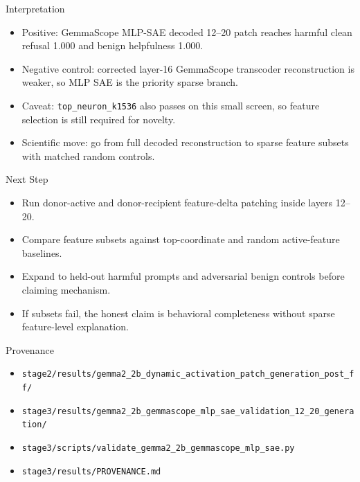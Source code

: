 \documentclass[aspectratio=169]{beamer}
\begin{document}
\begin{frame}{Interpretation}
  \begin{itemize}
    \item Positive: GemmaScope MLP-SAE decoded 12--20 patch reaches harmful clean refusal 1.000 and benign helpfulness 1.000.
    \item Negative control: corrected layer-16 GemmaScope transcoder reconstruction is weaker, so MLP SAE is the priority sparse branch.
    \item Caveat: \texttt{top\_neuron\_k1536} also passes on this small screen, so feature selection is still required for novelty.
    \item Scientific move: go from full decoded reconstruction to sparse feature subsets with matched random controls.
  \end{itemize}
\end{frame}

\begin{frame}{Next Step}
  \begin{itemize}
    \item Run donor-active and donor-recipient feature-delta patching inside layers 12--20.
    \item Compare feature subsets against top-coordinate and random active-feature baselines.
    \item Expand to held-out harmful prompts and adversarial benign controls before claiming mechanism.
    \item If subsets fail, the honest claim is behavioral completeness without sparse feature-level explanation.
  \end{itemize}
\end{frame}

\begin{frame}{Provenance}
  \begin{itemize}
    \item \texttt{stage2/results/gemma2\_2b\_dynamic\_activation\_patch\_generation\_post\_ff/}
    \item \texttt{stage3/results/gemma2\_2b\_gemmascope\_mlp\_sae\_validation\_12\_20\_generation/}
    \item \texttt{stage3/scripts/validate\_gemma2\_2b\_gemmascope\_mlp\_sae.py}
    \item \texttt{stage3/results/PROVENANCE.md}
  \end{itemize}
\end{frame}
\end{document}
